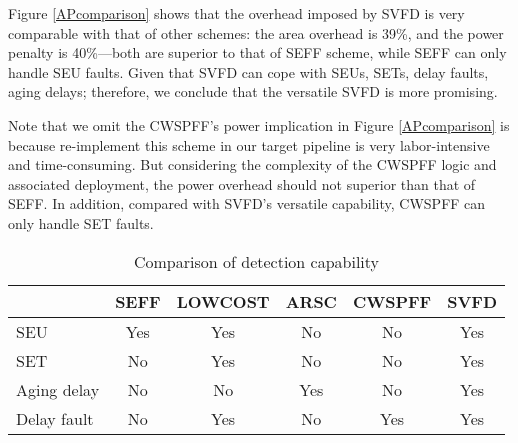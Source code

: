 Figure \ref{APcomparison} shows that the overhead imposed by SVFD is very comparable with that of other schemes: the area overhead is 39\%, and the power penalty is 40\%---both are superior to that of SEFF scheme, while SEFF can only handle SEU faults. Given that SVFD can cope with SEUs, SETs, delay faults, aging delays; therefore, we conclude that the versatile SVFD is more promising.

Note that we omit the CWSPFF's power implication in Figure \ref{APcomparison} is because re-implement this scheme in our target pipeline is very labor-intensive and time-consuming. But considering the complexity of the CWSPFF logic and associated deployment, the power overhead should not superior than that of SEFF. In addition, compared with SVFD's versatile capability, CWSPFF can only handle SET faults.


\begin{table}[t]
\begin{center}
\caption{Comparison of detection capability }\label{comparison}
\begin{tabular}{l||ccccc}
    &  SEFF\cite{Mitra_C05}  &  LOWCOST\cite{lowcost_date07} &  ARSC\cite{failure_prediction_07}  &  CWSPFF\cite{CWSP_DATE08}    &  SVFD \\
\hline

            SEU        &  Yes   & Yes    & No     & No     & Yes  \\
            SET        &  No    & Yes    & No     & No     & Yes  \\
            Aging delay&  No    & No     & Yes    & No     & Yes  \\
            Delay fault&  No    & Yes    &  No    & Yes    & Yes  \\
\hline %
\end{tabular}
\end{center}
\end{table}

